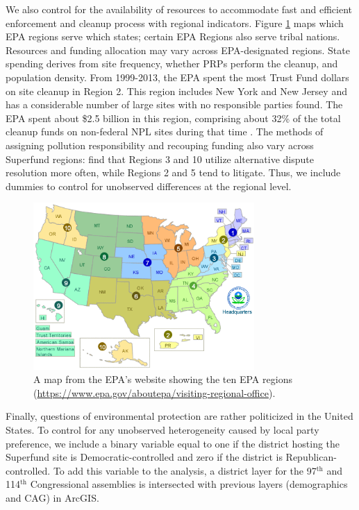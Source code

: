 \documentclass[12pt]{article}
\begin{document}
{We also control for the availability of resources to accommodate fast and efficient enforcement and cleanup process with regional indicators. Figure \ref{map} maps which EPA regions serve which states; certain EPA Regions also serve tribal nations. Resources and funding allocation may vary across EPA-designated regions. State spending derives from site frequency, whether PRPs perform the cleanup, and population density. From 1999-2013, the EPA spent the most Trust Fund dollars on site cleanup in Region 2. This region includes New York and New Jersey and has a considerable number of large sites with no responsible parties found. The EPA spent about \$2.5 billion in this region, comprising about 32\% of the total cleanup funds on non-federal NPL sites during that time \parencite{GAO2015}. The methods of assigning pollution responsibility and recouping funding also vary across Superfund regions: \textcite{church2001cleaning} find that Regions 3 and 10 utilize alternative dispute resolution more often, while Regions 2 and 5 tend to litigate. Thus, we include dummies to control for unobserved differences at the regional level.
 
 \begin{figure}[H] \centering
\includegraphics[width=0.75\textwidth]{us-regions.png}
\caption{\small A map from the EPA's website showing the ten EPA regions (\underline{https://www.epa.gov/aboutepa/visiting-regional-office}). \label{map}}
\end{figure}

Finally, questions of environmental protection are rather politicized in the United States. To control for any unobserved heterogeneity caused by local party preference, we include a binary variable equal to one if the district hosting the Superfund site is Democratic-controlled and zero if the district is Republican-controlled. To add this variable to the analysis, a district layer for the 97$^\mathrm{th}$ and 114$^\mathrm{th}$ Congressional assemblies is intersected with previous layers (demographics and CAG) in ArcGIS.

}
\end{document}
